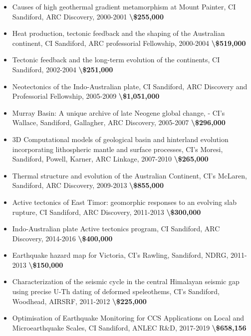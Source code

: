 \documentclass[
]{article}
\providecommand{\tightlist}{%
  \setlength{\itemsep}{0pt}\setlength{\parskip}{0pt}}
\begin{document}
\begin{itemize}
\tightlist
\item
  Causes of high geothermal gradient metamorphism at Mount Painter, CI
  Sandiford, ARC Discovery, 2000-2001 \textbf{\textbackslash\$255,000 }
\item
  Heat production, tectonic feedback and the shaping of the Australian
  continent, CI Sandiford, ARC professorial Fellowship, 2000-2004
  \textbf{\textbackslash\$519,000}
\item
  Tectonic feedback and the long-term evolution of the continents, CI
  Sandiford, 2002-2004 \textbf{\textbackslash\$251,000}
\item
  Neotectonics of the Indo-Australian plate, CI Sandiford, ARC Discovery
  and Professorial Fellowship, 2005-2009
  \textbf{\textbackslash\$1,051,000}
\item
  Murray Basin: A unique archive of late Neogene global change, - CI's
  Wallace, Sandiford, Gallagher, ARC Discovery, 2005-2007
  \textbf{\textbackslash\$296,000}
\item
  3D Computational models of geological basin and hinterland evolution
  incorporating lithospheric mantle and surface processes, CI's Moresi,
  Sandiford, Powell, Karner, ARC Linkage, 2007-2010
  \textbf{\textbackslash\$265,000}
\item
  Thermal structure and evolution of the Australian Continent, CI's
  McLaren, Sandiford, ARC Discovery, 2009-2013
  \textbf{\textbackslash\$855,000}
\item
  Active tectonics of East Timor: geomorphic responses to an evolving
  slab rupture, CI Sandiford, ARC Discovery, 2011-2013
  \textbf{\textbackslash\$300,000}
\item
  Indo-Australian plate Active tectonics program, CI Sandiford, ARC
  Discovery, 2014-2016 \textbf{\textbackslash\$400,000}
\item
  Earthquake hazard map for Victoria, CI's Rawling, Sandiford, NDRG,
  2011-2013 \textbf{\textbackslash\$150,000}
\item
  Characterization of the seismic cycle in the central Himalayan seismic
  gap using precise U-Th dating of deformed speleothems, CI's Sandiford,
  Woodhead, AIRSRF, 2011-2012 \textbf{\textbackslash\$225,000}
\item
  Optimisation of Earthquake Monitoring for CCS Applications on Local
  and Microearthquake Scales, CI Sandiford, ANLEC R\&D, 2017-2019
  \textbf{\textbackslash\$658,156}
\end{itemize}
\end{document}
